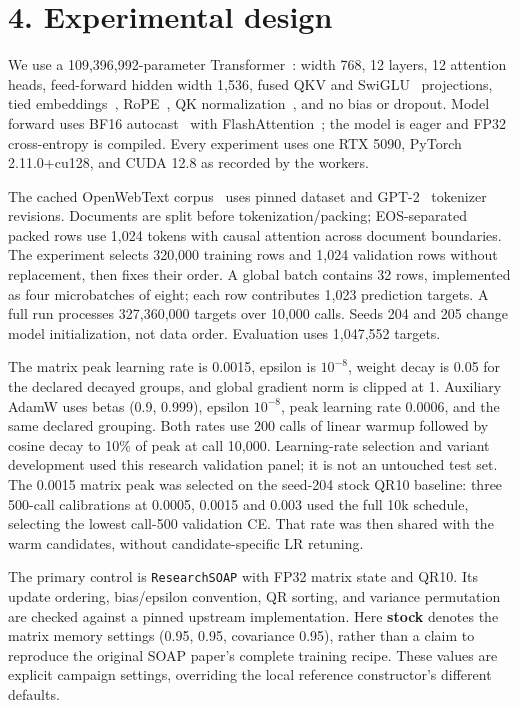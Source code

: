 \hypertarget{experimental-design}{%
\section{4. Experimental design}\label{experimental-design}}

We use a 109,396,992-parameter Transformer~\citep{vaswani2017attention}: width 768, 12 layers, 12
attention heads, feed-forward hidden width 1,536, fused QKV and SwiGLU~\citep{shazeer2020glu}
projections, tied embeddings~\citep{press2016using}, RoPE~\citep{su2021roformer},
QK normalization~\citep{dehghani2023scaling}, and no bias or
dropout. Model forward uses BF16 autocast~\citep{micikevicius2017mixed,kalamkar2019study}
with FlashAttention~\citep{dao2022flashattention,dao2023flashattention2}; the model
is eager and FP32 cross-entropy is compiled. Every experiment uses one
RTX 5090, PyTorch 2.11.0+cu128, and CUDA 12.8 as recorded by the
workers.

The cached OpenWebText corpus~\citep{gokaslan2019openwebtext} uses
pinned dataset and GPT-2~\citep{radford2019language} tokenizer
revisions. Documents are split before tokenization/packing;
EOS-separated packed rows use 1,024 tokens with causal attention across
document boundaries. The experiment selects 320,000 training rows and
1,024 validation rows without replacement, then fixes their order. A
global batch contains 32 rows, implemented as four microbatches of
eight; each row contributes 1,023 prediction targets. A full run
processes 327,360,000 targets over 10,000 calls. Seeds 204 and 205
change model initialization, not data order. Evaluation uses 1,047,552
targets.

The matrix peak learning rate is 0.0015, epsilon is \(10^{-8}\), weight
decay is 0.05 for the declared decayed groups, and global gradient norm
is clipped at 1. Auxiliary AdamW uses betas (0.9, 0.999), epsilon
\(10^{-8}\), peak learning rate 0.0006, and the same declared grouping.
Both rates use 200 calls of linear warmup followed by cosine decay to
10\% of peak at call 10,000. Learning-rate selection and variant
development used this research validation panel; it is not an untouched
test set. The 0.0015 matrix peak was selected on the seed-204 stock QR10
baseline: three 500-call calibrations at 0.0005, 0.0015 and 0.003 used
the full 10k schedule, selecting the lowest call-500 validation CE. That
rate was then shared with the warm candidates, without
candidate-specific LR retuning.

The primary control is \texttt{ResearchSOAP} with FP32 matrix state and
QR10. Its update ordering, bias/epsilon convention, QR sorting, and
variance permutation are checked against a pinned upstream
implementation. Here \textbf{stock} denotes the matrix memory settings
(0.95, 0.95, covariance 0.95), rather than a claim to reproduce the
original SOAP paper's complete training recipe. These values are
explicit campaign settings, overriding the local reference constructor's
different defaults.

